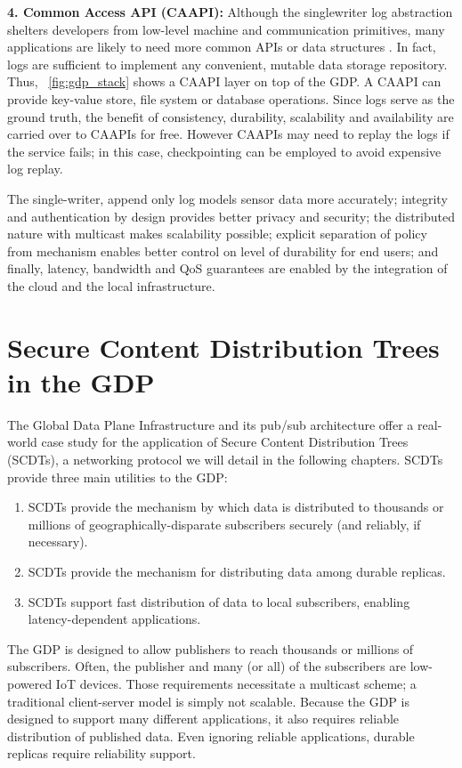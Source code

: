 \textbf{4. Common Access API (CAAPI):} Although the singlewriter
log abstraction shelters developers from low-level
machine and communication primitives, many applications
are likely to need more common APIs or data structures
\cite{tango}. In fact, logs are sufficient to implement any
convenient, mutable data storage repository. Thus, ~\autoref{fig:gdp_stack}
shows a CAAPI layer on top of the GDP. A CAAPI can
provide key-value store, file system or database operations.
Since logs serve as the ground truth, the benefit
of consistency, durability, scalability and availability are
carried over to CAAPIs for free. However CAAPIs may
need to replay the logs if the service fails; in this case,
checkpointing can be employed to avoid expensive log
replay.

The single-writer, append only
log models sensor data more accurately; integrity
and authentication by design provides better privacy and
security; the distributed nature with multicast
makes scalability possible; explicit separation of
policy from mechanism enables better control on level of
durability for end users; and finally, latency, bandwidth
and QoS guarantees are enabled by the integration of the
cloud and the local infrastructure.

\section{Secure Content Distribution Trees in the GDP}
\label{gdp-scdt}
The Global Data Plane Infrastructure and its pub/sub architecture offer a real-world case study for the application of Secure Content Distribution Trees (SCDTs), a networking protocol we will detail in the following chapters. SCDTs provide three main utilities to the GDP:

\begin{enumerate}  
	\item SCDTs provide the mechanism by which data is distributed to thousands or millions of geographically-disparate subscribers securely (and reliably, if necessary).
	\item SCDTs provide the mechanism for distributing data among durable replicas.
	\item SCDTs support fast distribution of data to local subscribers, enabling latency-dependent applications.
\end{enumerate}

The GDP is designed to allow publishers to reach thousands or millions of subscribers. Often, the publisher and many (or all) of the subscribers are low-powered IoT devices. Those requirements necessitate a multicast scheme; a traditional client-server model is simply not scalable. Because the GDP is designed to support many different applications, it also requires reliable distribution of published data. Even ignoring reliable applications, durable replicas require reliability support.

